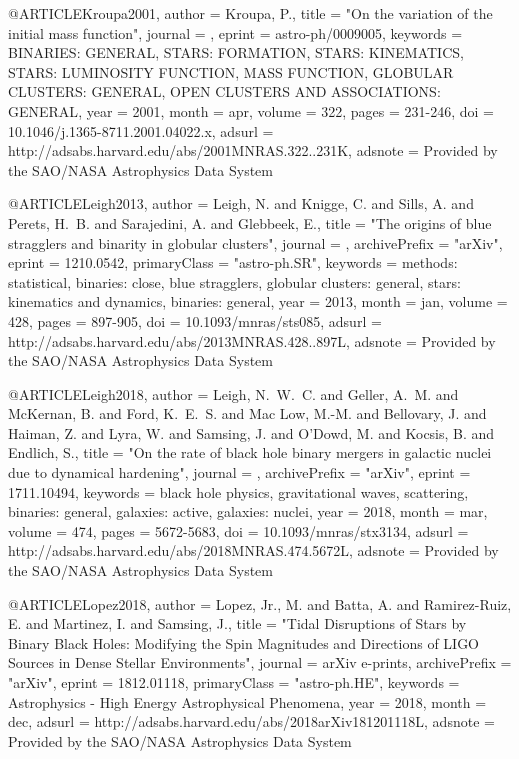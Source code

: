 \documentclass[twocolumn,tighten]{aastex63}
\begin{document}
{{{{{@ARTICLE{Kroupa2001,
   author = {{Kroupa}, P.},
    title = "{On the variation of the initial mass function}",
  journal = {\mnras},
   eprint = {astro-ph/0009005},
 keywords = {BINARIES: GENERAL, STARS: FORMATION, STARS: KINEMATICS, STARS: LUMINOSITY FUNCTION, MASS FUNCTION, GLOBULAR CLUSTERS: GENERAL, OPEN CLUSTERS AND ASSOCIATIONS: GENERAL},
     year = 2001,
    month = apr,
   volume = 322,
    pages = {231-246},
      doi = {10.1046/j.1365-8711.2001.04022.x},
   adsurl = {http://adsabs.harvard.edu/abs/2001MNRAS.322..231K},
  adsnote = {Provided by the SAO/NASA Astrophysics Data System}
}

@ARTICLE{Leigh2013,
   author = {{Leigh}, N. and {Knigge}, C. and {Sills}, A. and {Perets}, H.~B. and 
	{Sarajedini}, A. and {Glebbeek}, E.},
    title = "{The origins of blue stragglers and binarity in globular clusters}",
  journal = {\mnras},
archivePrefix = "arXiv",
   eprint = {1210.0542},
 primaryClass = "astro-ph.SR",
 keywords = {methods: statistical, binaries: close, blue stragglers, globular clusters: general, stars: kinematics and dynamics, binaries: general},
     year = 2013,
    month = jan,
   volume = 428,
    pages = {897-905},
      doi = {10.1093/mnras/sts085},
   adsurl = {http://adsabs.harvard.edu/abs/2013MNRAS.428..897L},
  adsnote = {Provided by the SAO/NASA Astrophysics Data System}
}


@ARTICLE{Leigh2018,
   author = {{Leigh}, N.~W.~C. and {Geller}, A.~M. and {McKernan}, B. and 
	{Ford}, K.~E.~S. and {Mac Low}, M.-M. and {Bellovary}, J. and 
	{Haiman}, Z. and {Lyra}, W. and {Samsing}, J. and {O'Dowd}, M. and 
	{Kocsis}, B. and {Endlich}, S.},
    title = "{On the rate of black hole binary mergers in galactic nuclei due to dynamical hardening}",
  journal = {\mnras},
archivePrefix = "arXiv",
   eprint = {1711.10494},
 keywords = {black hole physics, gravitational waves, scattering, binaries: general, galaxies: active, galaxies: nuclei},
     year = 2018,
    month = mar,
   volume = 474,
    pages = {5672-5683},
      doi = {10.1093/mnras/stx3134},
   adsurl = {http://adsabs.harvard.edu/abs/2018MNRAS.474.5672L},
  adsnote = {Provided by the SAO/NASA Astrophysics Data System}
}

@ARTICLE{Lopez2018,
   author = {{Lopez}, Jr., M. and {Batta}, A. and {Ramirez-Ruiz}, E. and 
	{Martinez}, I. and {Samsing}, J.},
    title = "{Tidal Disruptions of Stars by Binary Black Holes: Modifying the Spin Magnitudes and Directions of LIGO Sources in Dense Stellar Environments}",
  journal = {arXiv e-prints},
archivePrefix = "arXiv",
   eprint = {1812.01118},
 primaryClass = "astro-ph.HE",
 keywords = {Astrophysics - High Energy Astrophysical Phenomena},
     year = 2018,
    month = dec,
   adsurl = {http://adsabs.harvard.edu/abs/2018arXiv181201118L},
  adsnote = {Provided by the SAO/NASA Astrophysics Data System}
}

}}}}}
\end{document}
